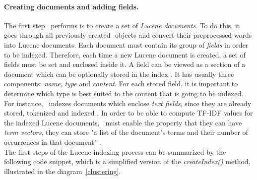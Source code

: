 \paragraph{Creating documents and adding fields.}
The first step \toolname\ performs is to create a set of \textit{Lucene documents}. 
To do this, it goes through all previously created \Crash-objects and convert their preprocessed words into Lucene documents. Each document must contain its group of \textit{fields} in order to be indexed.
Therefore, each time a new Lucene document is created, a set of fields must be set and enclosed inside it. 
A field can be viewed as a section of a document which can be optionally stored in the index \cite{lucenefield}. 
It has usually three components: \textit{name}, \textit{type} and \textit{content}. For each stored field, it is important to determine which type is best suited to the content that is going to be indexed. 
For instance, \toolname\ indexes documents which enclose \textit{text fields}, since they are already stored, tokenized and indexed \cite{lucenetextfield}. 
In order to be able to compute TF-IDF values for the indexed Lucene documents, \toolname\ must enable the property that they can have \textit{term vectors}, \ie they can store "a list of the document's terms and their number of occurrences in that document" \cite{lucenetermvector}. \\
The first steps of the Lucene indexing process can be summarized by the following code snippet, which is a simplified version of the \textit{createIndex()} method, illustrated in the diagram~\ref{clustering}.

